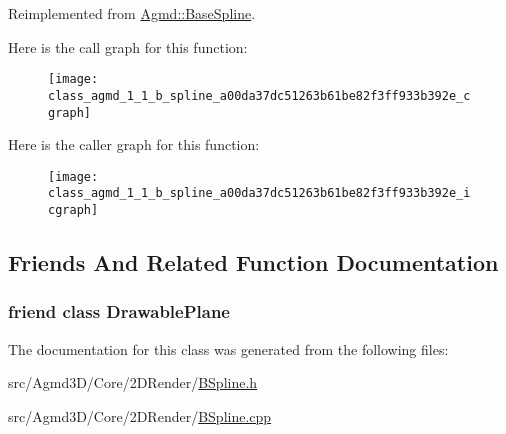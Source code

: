 Reimplemented from \hyperlink{class_agmd_1_1_base_spline_a589f90c641d154374b477152de1ac7a7}{Agmd\+::\+Base\+Spline}.



Here is the call graph for this function\+:\nopagebreak
\begin{figure}[H]
\begin{center}
\leavevmode
\texttt{[image: class\_agmd\_1\_1\_b\_spline\_a00da37dc51263b61be82f3ff933b392e\_cgraph]}
\end{center}
\end{figure}




Here is the caller graph for this function\+:\nopagebreak
\begin{figure}[H]
\begin{center}
\leavevmode
\texttt{[image: class\_agmd\_1\_1\_b\_spline\_a00da37dc51263b61be82f3ff933b392e\_icgraph]}
\end{center}
\end{figure}




\subsection{Friends And Related Function Documentation}
\hypertarget{class_agmd_1_1_b_spline_abd140f9d7517b23f834000b9238bd85f}{
\subsubsection[{Drawable\+Plane}]{\setlength{\rightskip}{0pt plus 5cm}friend class {\bf Drawable\+Plane}\hspace{0.3cm}{\ttfamily [friend]}}}\label{class_agmd_1_1_b_spline_abd140f9d7517b23f834000b9238bd85f}


The documentation for this class was generated from the following files\+:\begin{DoxyCompactItemize}
\item 
src/\+Agmd3\+D/\+Core/2\+D\+Render/\hyperlink{_b_spline_8h}{B\+Spline.\+h}\item 
src/\+Agmd3\+D/\+Core/2\+D\+Render/\hyperlink{_b_spline_8cpp}{B\+Spline.\+cpp}\end{DoxyCompactItemize}

